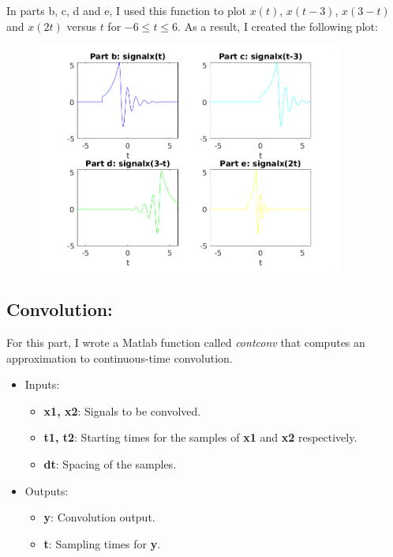 \documentclass[a4paper,11pt]{article}
\begin{document}
\bigskip

In parts b, c, d and e, I used this function to plot $x(t)$, $x(t-3)$, $x(3-t)$ and $x(2t)$ versus $t$ for $-6\leq t \leq 6$. As a result, I created the following plot: 

\newpage

\begin{figure}[!hp]
    \begin{center}
      \includegraphics[width=0.9\textwidth]{images/exercice_1.png}
    \end{center}
\end{figure}

\subsection{Convolution:}

For this part, I wrote a Matlab function called \textit{contconv} that computes an approximation to continuous-time convolution. 

\begin{itemize}
    \item Inputs:
    \begin{itemize}
        \item \textbf{x1, x2}: Signals to be convolved.
        \item \textbf{t1, t2}: Starting times for the samples of \textbf{x1} and \textbf{x2} respectively.
        \item \textbf{dt}: Spacing of the samples.
    \end{itemize}
    \item Outputs:
    \begin{itemize}
        \item \textbf{y}: Convolution output.
        \item \textbf{t}: Sampling times for \textbf{y}.
    \end{itemize}
\end{itemize}
\end{document}
